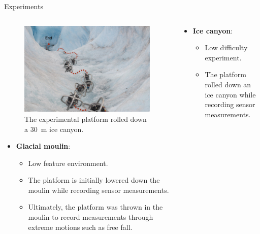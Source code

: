 \documentclass[final,hyperref={pdfpagelabels=false}]{beamer}
\begin{document}
\begin{frame}[t]
\begin{columns}[t]
\begin{column}{.465\textwidth}
\begin{block}{Experiments}
	\begin{columns} %
		\begin{column}{.5\textwidth} %
			\centering
			\begin{figure}
				\vspace{-25mm}
				\includegraphics[width=0.95\linewidth]{figures/ice_canyon.jpeg}
				\caption{The experimental platform rolled down a \SI{30}{\meter} ice canyon.}
			\end{figure}
			\begin{itemize}
				\item \textbf{Glacial moulin}: 
				\begin{itemize}
					\item Low feature environment.
					\item The platform is initially lowered down the moulin while recording sensor measurements.
					\item Ultimately, the platform was thrown in the moulin to record measurements through extreme motions such as free fall.
				\end{itemize}
			\end{itemize}
		\end{column}
		\begin{column}{.5\textwidth} %
			\begin{itemize}
				\item \textbf{Ice canyon}: 
				\begin{itemize}
					\item Low difficulty experiment.
					\item The platform rolled down an ice canyon while recording sensor measurements.

\end{itemize}
\end{itemize}
\end{column}
\end{columns}
\end{block}
\end{column}
\end{columns}
\end{frame}
\end{document}
